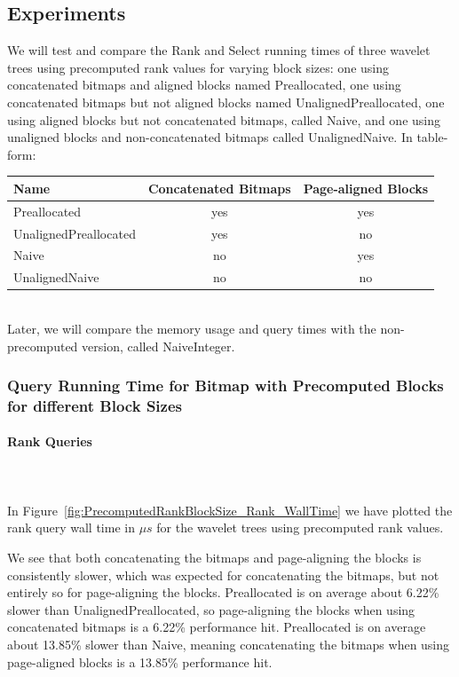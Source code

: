 \subsection{Experiments}
We will test and compare the Rank and Select running times of three wavelet trees using precomputed rank values for varying block sizes: one using concatenated bitmaps and aligned blocks named Preallocated, one using concatenated bitmaps but not aligned blocks named UnalignedPreallocated, one using aligned blocks but not concatenated bitmaps, called Naive,
and one using unaligned blocks and non-concatenated bitmaps called UnalignedNaive.
In table-form:\\
\begin{tabular}{|lcc|}
\hline
Name						& Concatenated Bitmaps	& Page-aligned Blocks	\\ \hline
Preallocated				& yes					& yes					\\ \hline
UnalignedPreallocated	& yes					& no						\\ \hline
Naive					& no						& yes					\\ \hline
UnalignedNaive			& no						& no						\\ \hline
\end{tabular}\\
Later, we will compare the memory usage and query times with the non-precomputed version, called NaiveInteger.

\subsubsection{Query Running Time for Bitmap with Precomputed Blocks for different Block Sizes}
\label{sec:queryRunTimePrecomputedBlockSizes}

\paragraph{Rank Queries}~\\\\
In Figure~\ref{fig:PrecomputedRankBlockSize_Rank_WallTime} we have plotted the rank query wall time in $\mu s$ for the wavelet trees using precomputed rank values.

We see that both concatenating the bitmaps and page-aligning the blocks is consistently slower, which was expected for concatenating the bitmaps, but not entirely so for page-aligning the blocks.
Preallocated is on average about 6.22\% slower than UnalignedPreallocated, so page-aligning the blocks when using concatenated bitmaps is a 6.22\% performance hit.
Preallocated is on average about 13.85\% slower than Naive, meaning concatenating the bitmaps when using page-aligned blocks is a 13.85\% performance hit.

